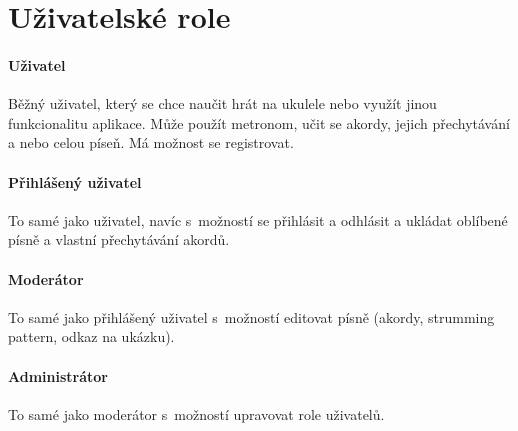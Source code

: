 \section{Uživatelské role}
\label{sc:user_roles}

\noindent \begin{minipage}{\textwidth}
    \paragraph{Uživatel}
    \begin{smallindent}{}
        Běžný uživatel, který se chce naučit hrát na ukulele nebo využít jinou funkcionalitu aplikace. Může použít metronom, učit se akordy, jejich přechytávání a nebo celou píseň.
        Má možnost se registrovat.
    \end{smallindent}
\end{minipage}


\noindent \begin{minipage}{\textwidth}
    \paragraph{Přihlášený uživatel}
    \begin{smallindent}{}
        To samé jako uživatel, navíc s~možností se přihlásit a odhlásit a ukládat oblíbené písně a vlastní přechytávání akordů.
    \end{smallindent}
\end{minipage}

\noindent \begin{minipage}{\textwidth}
    \paragraph{Moderátor}
    \begin{smallindent}{}
        To samé jako přihlášený uživatel s~možností editovat písně (akordy, strumming pattern, odkaz na ukázku).
    \end{smallindent}
\end{minipage}

\noindent \begin{minipage}{\textwidth}
    \paragraph{Administrátor}
    \begin{smallindent}{}
        To samé jako moderátor s~možností upravovat role uživatelů.
    \end{smallindent}
\end{minipage}
